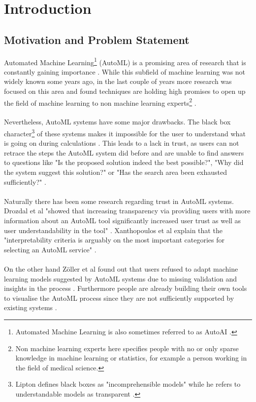 %
\chapter{Introduction}
\label{sec:intro}

\section{Motivation and Problem Statement}
\label{sec:intro:motivation}
Automated Machine Learning\footnote{Automated Machine Learning is also sometimes referred to as AutoAI \cite{aiviz}.} (AutoML) is a promising area of research that is constantly gaining importance \cite{humanloop}. While this subfield of machine learning was not widely known some years ago, in the last couple of years more research was focused on this area and found techniques are holding high promises to open up the field of machine learning to non machine learning experts\footnote{Non machine learning experts here specifies people with no or only sparse knowledge in machine learning or statistics, for example a person working in the field of medical science.} \cite{atmseer, xautoml}. 
\\ \\
Nevertheless, AutoML systems have some major drawbacks. The black box character\footnote{Lipton defines black boxes as "incomprehensible models" while he refers to understandable models as transparent \cite{mythos}.} of these systems makes it impossible for the user to understand what is going on during calculations \cite{aiviz, pipelineprof, atmseer}. This leads to a lack in trust, as users can not retrace the steps the AutoML system did before and are unable to find answers to questions like "Is the proposed solution indeed the best possible?", "Why did the system suggest this solution?" or "Has the search area been exhausted sufficiently?" \cite{atmseer, aiviz}.
\\ \\
Naturally there has been some research regarding trust in AutoML systems. Drozdal et al "showed that increasing transparency via providing users with more information about an AutoML tool significantly increased user trust as well as user understandability in the tool" \cite{trustautoml}. Xanthopoulos et al explain that the "interpretability criteria is arguably on the most important categories for selecting an AutoML service" \cite{humanloop}.
\\ \\
On the other hand Zöller et al found out that users refused to adapt machine learning models suggested by AutoML systems due to missing validation and insights in the process \cite{xautoml}. Furthermore people are already building their own tools to visualise the AutoML process since they are not sufficiently supported by existing systems \cite{hypertuner}. 
